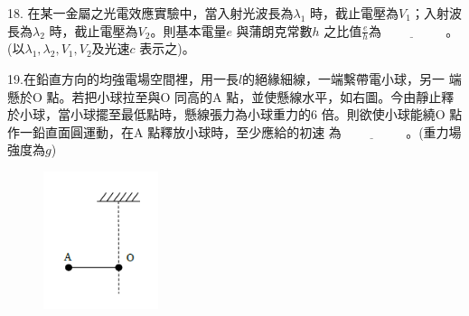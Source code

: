\documentclass[cn,10pt,math=newtx]{elegantbook}
\begin{document}
\newpage

\begin{example}
   18. 在某一金屬之光電效應實驗中，當入射光波長為$\lambda_1$ 時，截止電壓為$V_1$；入射波長為$\lambda_2$ 時，截止電壓為$V_2$。則基本電量$e$ 與蒲朗克常數$h$ 之比值$\frac{e}{h}$為$\underline{\hspace{2cm}}$ 。(以$\lambda_1, \lambda_2, V_1, V_2 及光速c$ 表示之)。\\
    \rightline{[中壢高中教甄109]}
\end{example}
\begin{solution}
    
\end{solution}

\newpage

\begin{example}
   19.在鉛直方向的均強電場空間裡，用一長$l$的絕緣細線，一端繫帶電小球，另一
端懸於O 點。若把小球拉至與O 同高的A 點，並使懸線水平，如右圖。今由靜止釋於小球，當小球擺至最低點時，懸線張力為小球重力的6 倍。則欲使小球能繞O 點作一鉛直面圓運動，在A 點釋放小球時，至少應給的初速
為$\underline{\hspace{2cm}}$ 。(重力場強度為$g$)\\
    \rightline{[中壢高中教甄109]}
\end{example}
\begin{solution}
    
\end{solution}
\begin{figure}[htbp]
    \flushright
    \includegraphics[width=0.3\textwidth]{image/109中壢19.png}
  \end{figure}
\newpage
\end{document}

